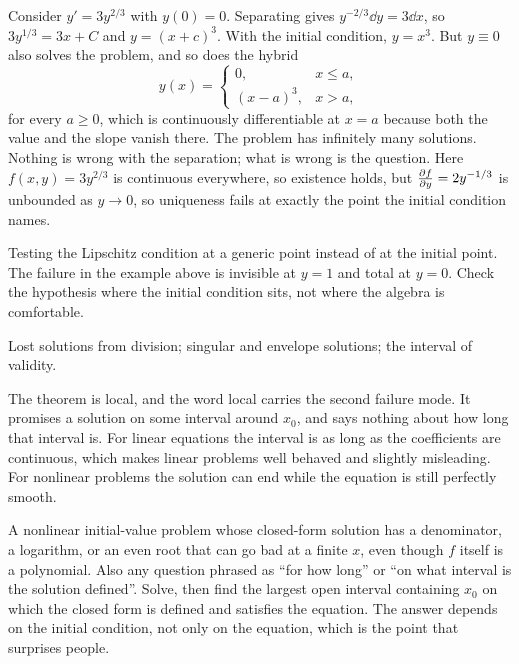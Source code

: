 \begin{worked}
Consider $y'=3y^{2/3}$ with $y(0)=0$. Separating gives $y^{-2/3}\dd y=3\dd x$, so $3y^{1/3}=3x+C$ and $y=(x+c)^3$. With the initial condition, $y=x^3$. But $y\equiv0$ also solves the problem, and so does the hybrid
\[
y(x)=\begin{cases}0,& x\leq a,\\ (x-a)^3,& x>a,\end{cases}
\]
for every $a\geq0$, which is continuously differentiable at $x=a$ because both the value and the slope vanish there. The problem has infinitely many solutions. Nothing is wrong with the separation; what is wrong is the question. Here $f(x,y)=3y^{2/3}$ is continuous everywhere, so existence holds, but $\frac{\partial f}{\partial y}=2y^{-1/3}$ is unbounded as $y\to0$, so uniqueness fails at exactly the point the initial condition names.
\end{worked}

\begin{trap}
Testing the Lipschitz condition at a generic point instead of at the initial point. The failure in the example above is invisible at $y=1$ and total at $y=0$. Check the hypothesis where the initial condition sits, not where the algebra is comfortable.
\end{trap}

\begin{seealsob}Lost solutions from division; singular and envelope solutions; the interval of validity.\end{seealsob}

The theorem is local, and the word local carries the second failure mode. It promises a solution on some interval around $x_0$, and says nothing about how long that interval is. For linear equations the interval is as long as the coefficients are continuous, which makes linear problems well behaved and slightly misleading. For nonlinear problems the solution can end while the equation is still perfectly smooth.

\cue A nonlinear initial-value problem whose closed-form solution has a denominator, a logarithm, or an even root that can go bad at a finite $x$, even though $f$ itself is a polynomial. Also any question phrased as ``for how long'' or ``on what interval is the solution defined''.
\method Solve, then find the largest open interval containing $x_0$ on which the closed form is defined and satisfies the equation. The answer depends on the initial condition, not only on the equation, which is the point that surprises people.

